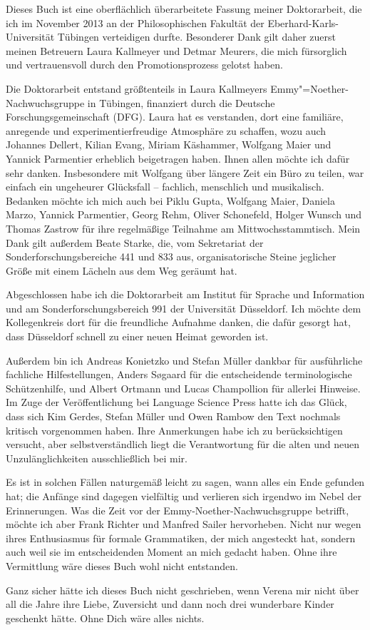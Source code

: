 

Dieses Buch ist eine oberflächlich überarbeitete Fassung meiner Doktorarbeit, die ich im November 2013 an der Philosophischen Fakultät der Eberhard-Karls-Universität Tübingen verteidigen durfte. Besonderer Dank gilt daher zuerst meinen Betreuern Laura Kallmeyer und Detmar Meurers, die mich fürsorglich und vertrauensvoll durch den Promotionsprozess gelotst haben. 

Die Doktorarbeit entstand größtenteils in Laura Kallmeyers Emmy"=Noe\-ther-Nachwuchsgruppe in Tübingen, finanziert durch die Deutsche Forschungsgemeinschaft (DFG). Laura hat es verstanden, dort eine familiäre, anregende und experimentierfreudige Atmosphäre zu schaffen, wozu auch Johannes Dellert, Kilian Evang, Miriam Käshammer, Wolfgang Maier und Yannick Parmentier erheblich beigetragen haben. Ihnen allen möchte ich dafür sehr danken. Insbesondere mit Wolfgang über längere Zeit ein Büro zu teilen, war einfach ein ungeheurer Glücksfall -- fachlich, menschlich und musikalisch. Bedanken möchte ich mich auch bei Piklu Gupta, Wolfgang Maier, Daniela Marzo, Yannick Parmentier, Georg Rehm, Oliver Schonefeld, Holger Wunsch und Thomas Zastrow für ihre regelmäßige Teilnahme am Mittwochsstammtisch. Mein Dank gilt außerdem Beate Starke, die, vom Sekretariat der Sonderforschungsbereiche 441 und 833 aus, organisatorische Steine jeglicher Größe mit einem Lächeln aus dem Weg geräumt hat.

Abgeschlossen habe ich die Doktorarbeit am Institut für Sprache und Information und am Sonderforschungsbereich 991 der Universität Düsseldorf. Ich möchte dem Kollegenkreis dort für die freundliche Aufnahme danken, die dafür gesorgt hat, dass Düsseldorf schnell zu einer neuen Heimat geworden ist.    

Außerdem bin ich Andreas Konietzko und Stefan Müller dankbar für ausführliche fachliche Hilfestellungen, Anders S\o{}gaard für die entscheidende terminologische Schützenhilfe, und Albert Ortmann und Lucas Champollion für allerlei Hinweise. Im Zuge der Veröffentlichung bei Language Science Press hatte ich das Glück, dass sich Kim Gerdes, Stefan Müller und Owen Rambow den Text nochmals kritisch vorgenommen haben. Ihre Anmerkungen habe ich zu berücksichtigen versucht, aber selbstverständlich liegt die Verantwortung für die alten und neuen Unzulänglichkeiten ausschließlich bei mir.


Es ist in solchen Fällen naturgemäß leicht zu sagen, wann alles ein Ende gefunden hat; die Anfänge sind dagegen vielfältig und verlieren sich irgendwo im Nebel der Erinnerungen. Was die Zeit vor der Emmy-Noether-Nachwuchsgruppe betrifft, möchte ich aber Frank Richter und Manfred Sailer hervorheben. Nicht nur wegen ihres Enthusiasmus für formale Grammatiken, der mich angesteckt hat, sondern auch weil sie im entscheidenden Moment an mich gedacht haben. Ohne ihre Vermittlung wäre dieses Buch wohl nicht entstanden. 

Ganz sicher hätte ich dieses Buch nicht geschrieben, wenn Verena mir nicht
über all die Jahre ihre Liebe, Zuversicht und dann noch drei wunderbare
Kinder geschenkt hätte. Ohne Dich wäre alles nichts.













